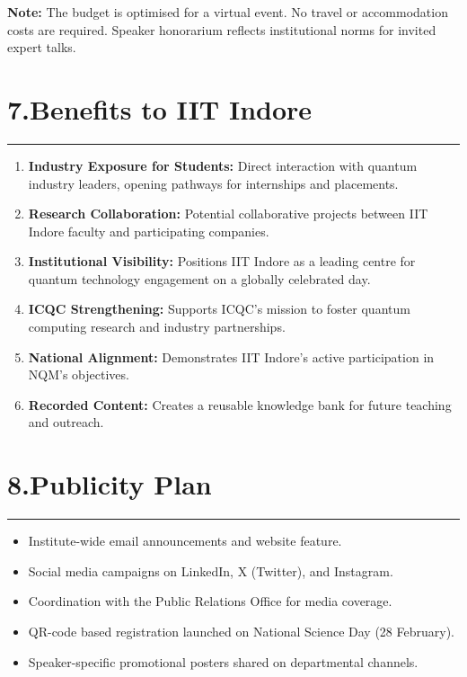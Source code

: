 \documentclass[12pt,a4paper]{article}
\begin{document}
\textbf{Note:} The budget is optimised for a virtual event. No travel or accommodation costs are required. Speaker honorarium reflects institutional norms for invited expert talks.

\section*{7.\quad Benefits to IIT Indore}
\vspace{-4pt}\hrule\vspace{6pt}

\begin{enumerate}
  \item \textbf{Industry Exposure for Students:} Direct interaction with quantum industry leaders, opening pathways for internships and placements.
  \item \textbf{Research Collaboration:} Potential collaborative projects between IIT Indore faculty and participating companies.
  \item \textbf{Institutional Visibility:} Positions IIT Indore as a leading centre for quantum technology engagement on a globally celebrated day.
  \item \textbf{ICQC Strengthening:} Supports ICQC's mission to foster quantum computing research and industry partnerships.
  \item \textbf{National Alignment:} Demonstrates IIT Indore's active participation in NQM's objectives.
  \item \textbf{Recorded Content:} Creates a reusable knowledge bank for future teaching and outreach.
\end{enumerate}

\section*{8.\quad Publicity Plan}
\vspace{-4pt}\hrule\vspace{6pt}

\begin{itemize}
  \item Institute-wide email announcements and website feature.
  \item Social media campaigns on LinkedIn, X (Twitter), and Instagram.
  \item Coordination with the Public Relations Office for media coverage.
  \item QR-code based registration launched on National Science Day (28 February).
  \item Speaker-specific promotional posters shared on departmental channels.
\end{itemize}
\end{document}
